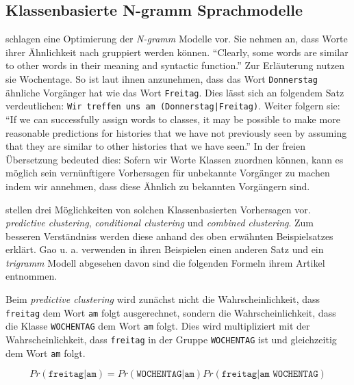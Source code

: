 \subsection{Klassenbasierte N-gramm Sprachmodelle}
\label{sec:brownClustering}
    
    \cite{cumpatationalLinguistics:classBasedNGramms} schlagen eine Optimierung der \emph{N-gramm} Modelle vor. Sie nehmen an, dass Worte ihrer Ähnlichkeit nach gruppiert werden können. \enquote{Clearly, some words are similar to other words in their meaning and syntactic function.} \parencite[S. 470]{cumpatationalLinguistics:classBasedNGramms} Zur Erläuterung nutzen sie Wochentage. So ist laut ihnen anzunehmen, dass das Wort \texttt{Donnerstag} ähnliche Vorgänger hat wie das Wort \texttt{Freitag}. Dies lässt sich an folgendem Satz verdeutlichen: \texttt{Wir treffen uns am (Donnerstag|Freitag)}.
    Weiter folgern sie: \enquote{If we can successfully assign words to classes, it may be possible to make more reasonable predictions for histories that we have not previously seen by assuming that they are similar to other histories that we have seen.} \parencite[S. 471]{cumpatationalLinguistics:classBasedNGramms} In der freien Übersetzung bedeuted dies: Sofern wir Worte Klassen zuordnen können, kann es möglich sein vernünftigere Vorhersagen für unbekannte Vorgänger zu machen indem wir annehmen, dass diese Ähnlich zu bekannten Vorgängern sind.
    
    \cite{cumpatationalLinguistics:theuse} stellen drei Möglichkeiten von solchen Klassenbasierten Vorhersagen vor. \emph{predictive clustering}, \emph{conditional clustering} und \emph{combined clustering}. Zum besseren Verständniss werden diese anhand des oben erwähnten Beispielsatzes erklärt. Gao u. a. verwenden in ihren Beispielen einen anderen Satz und ein \emph{trigramm} Modell abgesehen davon sind die folgenden Formeln ihrem Artikel entnommen. 
    
    Beim \emph{predictive clustering} wird zunächst nicht die Wahrscheinlichkeit, dass \texttt{freitag} dem Wort \texttt{am} folgt ausgerechnet, sondern die Wahrscheinlichkeit, dass die Klasse \texttt{WOCHENTAG} dem Wort \texttt{am} folgt. Dies wird multipliziert mit der Wahrscheinlichkeit, dass \texttt{freitag} in der Gruppe \texttt{WOCHENTAG} ist und gleichzeitig dem Wort \texttt{am} folgt.
   	
     \begin{equation}
   		Pr(\texttt{freitag}|\texttt{am}) = Pr(\texttt{WOCHENTAG}|\texttt{am}) Pr(\texttt{freitag}|\texttt{am WOCHENTAG})
        \label{eq:predictive-clustering-words}
	\end{equation}
    
